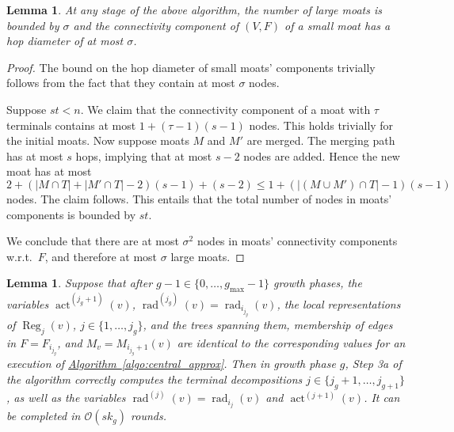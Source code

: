 \documentclass[letterpaper,11pt]{article}
\newtheorem{lemma}[theorem]{Lemma}
\newcommand{\namedref}[2]{\hyperref[#2]{#1~\ref*{#2}}}
\newcommand{\algref}[1]{\namedref{Algorithm}{#1}}
\newcommand{\BO}{\mathcal{O}}
\DeclareMathOperator{\act}{act}
\DeclareMathOperator{\moat}{rad}
\DeclareMathOperator{\reg}{Reg}
\begin{document}
\begin{lemma}\label{lemma:large_moats}
At any stage of the above algorithm, the number of large moats is bounded by
$\sigma$ and the connectivity component of $(V,F)$ of a small moat has a hop
diameter of at most $\sigma$.
\end{lemma}
\begin{proof}
The bound on the hop diameter of small moats' components trivially follows from
the fact that they contain at most $\sigma$ nodes.

Suppose $st< n$. We claim that the connectivity component of a moat with $\tau$
terminals contains at most $1+(\tau-1)(s-1)$ nodes. This holds trivially for the
initial moats. Now suppose moats $M$ and $M'$ are merged. The merging path has
at most $s$ hops, implying that at most $s-2$ nodes are added. Hence the new
moat has at most $2+(|M\cap T|+|M'\cap T|-2)(s-1)+(s-2)\leq 1+(|(M\cup M')\cap
T|-1)(s-1)$ nodes. The claim follows. This entails that the total
number of nodes in moats' components is bounded by $st$.

We conclude that there are at most $\sigma^2$ nodes in moats' connectivity
components w.r.t.\ $F$, and therefore at most $\sigma$ large moats.
\end{proof}
\begin{lemma}\label{lemma:decomp_correct}
Suppose that after $g-1\in \{0,\ldots,g_{\max}-1\}$ growth phases, the
variables $\act^{(j_g+1)}(v)$, $\moat^{(j_g)}(v)=\moat_{i_{j_g}}(v)$,
the local representations of $\reg_j(v)$, $j\in \{1,\ldots,j_g\}$, and the trees
spanning them, membership of edges in $F=F_{i_{j_g}}$, and
$M_v=M_{i_{j_g}+1}(v)$ are identical to the corresponding values for an
execution of \algref{algo:central_approx}. Then in growth phase $g$, Step 3a
of the algorithm correctly computes the terminal decompositions $j\in
\{j_g+1,\ldots,j_{g+1}\}$, as well as the variables
$\moat^{(j)}(v)=\moat_{i_j}(v)$ and $\act^{(j+1)}(v)$. It can be completed in
$\BO(sk_g)$ rounds.
\end{lemma}
\end{document}
